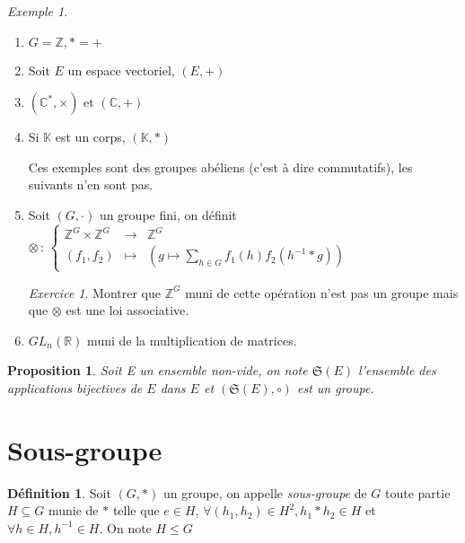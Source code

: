 \documentclass[]{article}
\newtheorem{myproposition}{Proposition}
\theoremstyle{remark}
\newtheorem{myexer}{Exercice}
\newtheorem{myexmpl}{Exemple}
\theoremstyle{definition}
\newtheorem{mydef}{Définition}
\newcommand{\func}[5]{
#1 \, : \, \left\{ \begin{array}{lcl}
	#2 & \longrightarrow & #3 \\
	#4 & \longmapsto & #5
\end{array}
\right.
}
\begin{document}
\begin{myexmpl}
	\leavevmode
	\begin{enumerate}
		\item $G=\mathbb{Z}, *=+$
		\item Soit $E$ un espace vectoriel, $(E, +)$
		\item $(\mathbb{C}^*, \times)$ et $(\mathbb{C}, +)$
		\item Si $\mathbb{K}$ est un corps, $(\mathbb{K}, *)$

		Ces exemples sont des groupes abéliens (c'est à dire commutatifs), les suivants n'en sont pas.
		
		\item Soit $(G, \cdot)$ un groupe fini, on définit $\func{\otimes}{\mathbb{Z}^G \times \mathbb{Z}^G}{\mathbb{Z}^G}{(f_1,f_2)}{\left(g \longmapsto \displaystyle \sum_{h \in G} f_1(h)f_2(h^{-1}*g)\right)}$
		
		\begin{myexer}
			Montrer que $\mathbb{Z}^G$ muni de cette opération n'est pas un groupe mais que $\otimes$ est une loi associative.
		\end{myexer}
		\item $GL_n(\mathbb{R})$ muni de la multiplication de matrices.
	\end{enumerate}
\end{myexmpl}

\begin{myproposition}
	Soit E un ensemble non-vide, on note $\mathfrak{S}(E)$ l'ensemble des applications bijectives de $E$ dans $E$ et $(\mathfrak{S}(E), \circ)$ est un groupe.
\end{myproposition}

\section{Sous-groupe}

\begin{mydef}
	Soit $(G, *)$ un groupe, on appelle \textit{sous-groupe} de $G$ toute partie $H \subseteq G$ munie de $*$ telle que $e \in H$, $\forall (h_1,h_2) \in H^2, h_1*h_2 \in H$  et $\forall h \in H, h^{-1} \in H$.
	On note $H \leqslant G$
\end{mydef}
\end{document}
